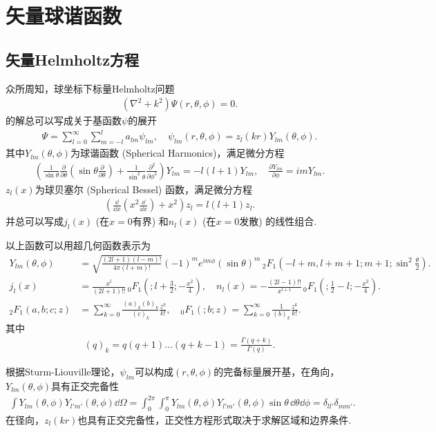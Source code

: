 \chapter{矢量球谐函数}
\section{矢量Helmholtz方程}
众所周知，球坐标下标量Helmholtz问题
\begin{align*}
	(\nabla^2 + k^2) \Psi(r, \theta, \phi) = 0.
\end{align*}
的解总可以写成关于基函数\(\psi\)的展开
\begin{align*}
	\Psi = \sum_{l=0}^{\infty} \sum_{m=-l}^{l} a_{lm} \psi_{lm}, \quad
	\psi_{lm}(r, \theta, \phi) = z_l(kr) Y_{lm}(\theta, \phi).
\end{align*}
其中\(Y_{lm}(\theta, \phi)\)为球谐函数 (Spherical Harmonics)，满足微分方程
\begin{align*}
	\left( \frac{1}{\sin\theta} \frac{\partial}{\partial\theta} \left( \sin\theta \frac{\partial}{\partial\theta} \right) + \frac{1}{\sin^2\theta} \frac{\partial^2}{\partial\phi^2} \right) Y_{lm} = -l(l+1) Y_{lm}, \quad
	\frac{\partial Y_{lm}}{\partial\phi} = imY_{lm}.
\end{align*}
\(z_l(x)\)为球贝塞尔 (Spherical Bessel) 函数，满足微分方程
\begin{align*}
	\left( \frac{\dd}{\dd x} \left( x^2 \frac{\dd}{\dd x} \right) + x^2 \right) z_l = l(l+1) z_l.
\end{align*}
并总可以写成\(j_l(x)\) (在\(x=0\)有界) 和\(n_l(x)\) (在\(x=0\)发散) 的线性组合.

以上函数可以用超几何函数表示为
\begin{align*}
	Y_{lm}(\theta, \phi) &= \sqrt{\frac{(2l+1)(l-m)!}{4\pi(l+m)!}} (-1)^m e^{im\phi} (\sin\theta)^m \, _2F_1(-l+m, l+m+1; m+1; \sin^2\frac{\theta}{2}). \\
	j_l(x) &= \frac{x^l}{(2l+1)!!} \, _0F_1(; l+\frac{3}{2}; -\frac{x^2}{4}), \quad
	n_l(x) = -\frac{(2l-1)!!}{x^{l+1}} \, _0F_1(; \frac{1}{2}-l; -\frac{x^2}{4}). \\
	_2F_1(a, b;c; z) &= \sum_{k=0}^{\infty} \frac{(a)_k (b)_k}{(c)_k} \frac{z^k}{k!}, \quad
	_0F_1(; b; z) = \sum_{k=0}^{\infty} \frac{1}{(b)_k} \frac{z^k}{k!}.
\end{align*}
其中
\begin{align*}
	(q)_k = q(q+1)\dots(q+k-1) = \frac{\Gamma(q+k)}{\Gamma(q)}.
\end{align*}

根据Sturm-Liouville理论，\(\psi_{lm}\)可以构成\((r, \theta, \phi)\)的完备标量展开基，在角向，\(Y_{lm}(\theta, \phi)\)具有正交完备性
\begin{align*}
	\int Y_{lm}(\theta, \phi) Y_{l'm'}(\theta, \phi) \dd \Omega = \int_0^{2\pi} \int_0^{\pi} Y_{lm}(\theta, \phi) Y_{l'm'}(\theta, \phi) \sin\theta \, \dd \theta \dd \phi
	= \delta_{ll'} \delta_{mm'}.
\end{align*}
在径向，\(z_l(kr)\)也具有正交完备性，正交性方程形式取决于求解区域和边界条件.

